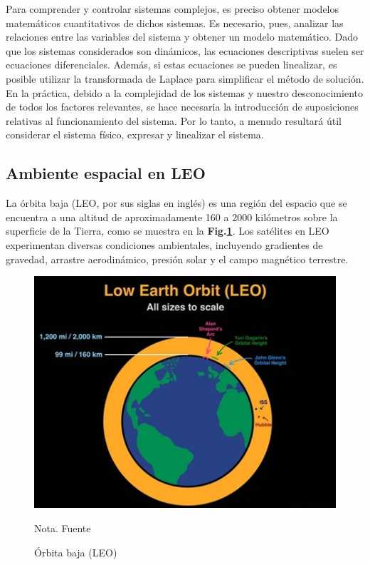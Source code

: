 Para comprender y controlar sistemas complejos, es preciso obtener modelos matemáticos cuantitativos de dichos sistemas. Es necesario, pues, analizar las relaciones entre las variables del sistema y obtener un modelo matemático. Dado que los sistemas considerados son dinámicos, las ecuaciones descriptivas suelen ser ecuaciones diferenciales. Además, si estas ecuaciones se pueden linealizar, es posible utilizar la transformada de Laplace para simplificar el método de solución. En la práctica, debido a la complejidad de los sistemas y nuestro desconocimiento de todos los factores relevantes, se hace necesaria la introducción de suposiciones relativas al funcionamiento del sistema. Por lo tanto, a menudo resultará útil considerar el sistema físico, expresar y linealizar el sistema.
 
\subsection{Ambiente espacial en LEO}

La órbita baja (LEO, por sus siglas en inglés) es una región del espacio que se encuentra a una altitud de aproximadamente 160 a 2000 kilómetros sobre la superficie de la Tierra, como se muestra en la \textbf{Fig.\ref{fig:leo}}. Los satélites en LEO experimentan diversas condiciones ambientales, incluyendo gradientes de gravedad, arrastre aerodinámico, presión solar y el campo magnético terrestre. 


\begin{figure}[!ht]
	\begin{center}
		\includegraphics[scale=1]{imagenes/marco_teorico/leo.jpg}\\
	\end{center}
	\caption{  Órbita baja (LEO)}
	\label{fig:leo}
		\footnotesize{Nota. Fuente \cite{opc:LEO}}
\end{figure}

